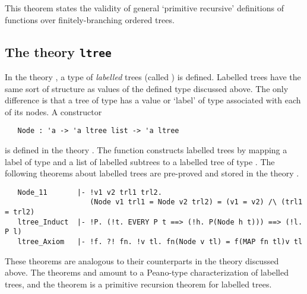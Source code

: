 {\noindent This theorem states the validity of general `primitive recursive'
definitions of functions over finitely-branching ordered trees.

\subsection{The theory {\tt ltree}}

In the theory , a type of {\it
labelled\/} trees (called ) is defined. Labelled trees have the
same sort of structure as values of the defined type  discussed above.
The only difference is that a tree of type  has a value or `label'
of type  associated with each of its nodes.  A constructor

\begin{hol}
\begin{verbatim}
   Node : 'a -> 'a ltree list -> 'a ltree
\end{verbatim}\end{hol}

\noindent is defined in the theory .  The function 
constructs labelled trees by mapping a label of type  and a list of
labelled subtrees to a labelled tree of type .
The following theorems about labelled trees are pre-proved and stored in the
theory .

\begin{hol}
\begin{verbatim}
   Node_11       |- !v1 v2 trl1 trl2.
                    (Node v1 trl1 = Node v2 trl2) = (v1 = v2) /\ (trl1 = trl2)
   ltree_Induct  |- !P. (!t. EVERY P t ==> (!h. P(Node h t))) ==> (!l. P l)
   ltree_Axiom   |- !f. ?! fn. !v tl. fn(Node v tl) = f(MAP fn tl)v tl
\end{verbatim}\end{hol}

\noindent These  theorems  are  analogous to  their counterparts  in the theory
 discussed  above.    The theorems  
and  amount to a Peano-type characterization of labelled
trees, and the theorem  is a primitive recursion theorem for
labelled trees.


}
